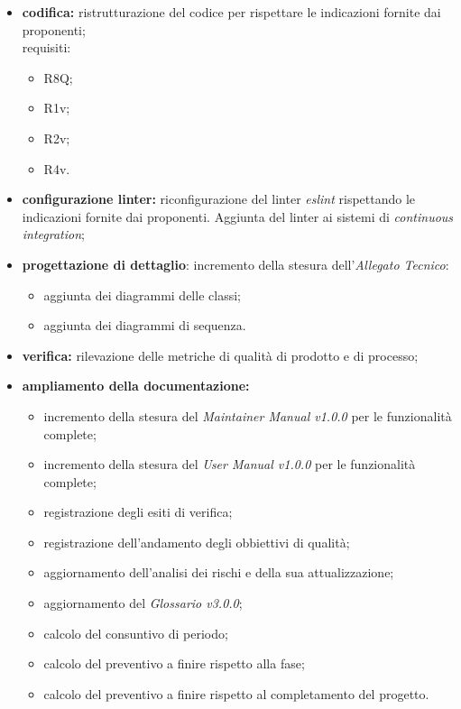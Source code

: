 \begin{itemize}
    \item \textbf{codifica:} ristrutturazione del codice per rispettare le indicazioni fornite dai proponenti;\\ requisiti:
          \begin{itemize}
              \item R8Q;
              \item R1v;
              \item R2v;
              \item R4v.
          \end{itemize}
    \item \textbf{configurazione linter:} riconfigurazione del linter \textit{eslint} rispettando le indicazioni fornite dai proponenti. Aggiunta del linter ai sistemi di \textit{continuous integration};
    \item \textbf{progettazione di dettaglio}: incremento della stesura dell'\textit{Allegato Tecnico}:
          \begin{itemize}
              \item aggiunta dei diagrammi delle classi;
              \item aggiunta dei diagrammi di sequenza.
          \end{itemize}
    \item \textbf{verifica:} rilevazione delle metriche di qualità di prodotto e di processo;
    \item \textbf{ampliamento della documentazione:}
          \begin{itemize}
              \item incremento della stesura del \textit{Maintainer Manual v1.0.0} per le funzionalità complete;
              \item incremento della stesura del \textit{User Manual v1.0.0} per le funzionalità complete;
              \item registrazione degli esiti di verifica;
              \item registrazione dell'andamento degli obbiettivi di qualità;
              \item aggiornamento dell'analisi dei rischi e della sua attualizzazione;
              \item aggiornamento del \textit{Glossario v3.0.0};
              \item calcolo del consuntivo di periodo;
              \item calcolo del preventivo a finire rispetto alla fase;
              \item calcolo del preventivo a finire rispetto al completamento del progetto.
          \end{itemize}
\end{itemize}
